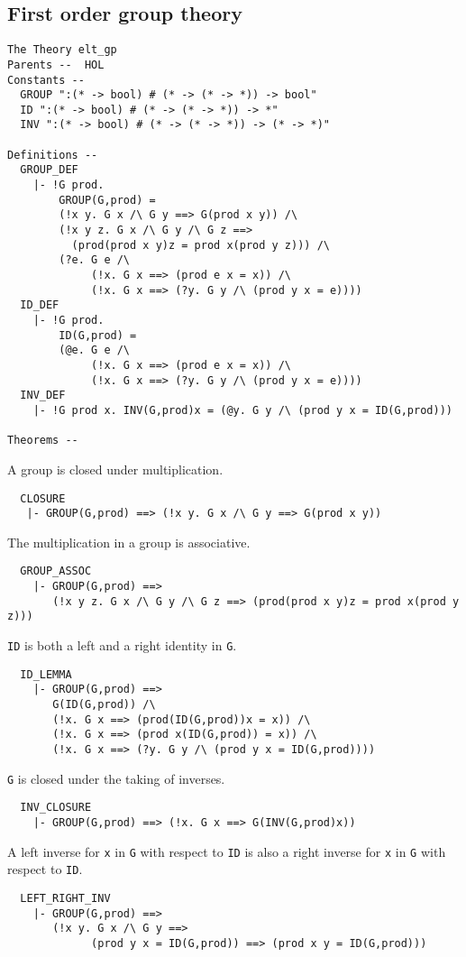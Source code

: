 \subsection{First order group theory}
\begin{verbatim}
The Theory elt_gp
Parents --  HOL     
Constants --
  GROUP ":(* -> bool) # (* -> (* -> *)) -> bool"
  ID ":(* -> bool) # (* -> (* -> *)) -> *"
  INV ":(* -> bool) # (* -> (* -> *)) -> (* -> *)"

Definitions --
  GROUP_DEF
    |- !G prod.
        GROUP(G,prod) =
        (!x y. G x /\ G y ==> G(prod x y)) /\
        (!x y z. G x /\ G y /\ G z ==> 
          (prod(prod x y)z = prod x(prod y z))) /\
        (?e. G e /\
             (!x. G x ==> (prod e x = x)) /\
             (!x. G x ==> (?y. G y /\ (prod y x = e))))
  ID_DEF
    |- !G prod.
        ID(G,prod) =
        (@e. G e /\
             (!x. G x ==> (prod e x = x)) /\
             (!x. G x ==> (?y. G y /\ (prod y x = e))))
  INV_DEF
    |- !G prod x. INV(G,prod)x = (@y. G y /\ (prod y x = ID(G,prod)))

Theorems --
\end{verbatim}
A group is closed under multiplication.
\begin{verbatim}
  CLOSURE 
   |- GROUP(G,prod) ==> (!x y. G x /\ G y ==> G(prod x y))

\end{verbatim}
The multiplication in a group is associative.
\begin{verbatim}
  GROUP_ASSOC
    |- GROUP(G,prod) ==>
       (!x y z. G x /\ G y /\ G z ==> (prod(prod x y)z = prod x(prod y z)))

\end{verbatim}
{\tt ID} is both a left and a right identity in {\tt G}.
\begin{verbatim}
  ID_LEMMA
    |- GROUP(G,prod) ==>
       G(ID(G,prod)) /\
       (!x. G x ==> (prod(ID(G,prod))x = x)) /\
       (!x. G x ==> (prod x(ID(G,prod)) = x)) /\
       (!x. G x ==> (?y. G y /\ (prod y x = ID(G,prod))))

\end{verbatim}
{\tt G} is closed under the taking of inverses.
\begin{verbatim}
  INV_CLOSURE
    |- GROUP(G,prod) ==> (!x. G x ==> G(INV(G,prod)x))

\end{verbatim}
A left inverse for {\tt x} in {\tt G} with respect to {\tt ID} is also a right
inverse for {\tt x} in {\tt G} with respect to {\tt ID}.
\begin{verbatim}
  LEFT_RIGHT_INV
    |- GROUP(G,prod) ==>
       (!x y. G x /\ G y ==>
             (prod y x = ID(G,prod)) ==> (prod x y = ID(G,prod)))

\end{verbatim}
